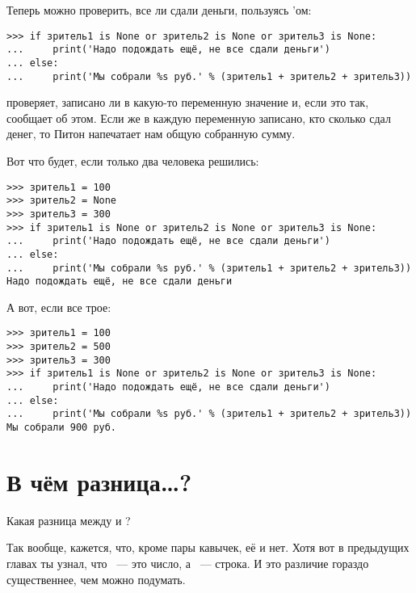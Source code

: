 Теперь можно проверить, все ли сдали деньги, пользуясь 'ом:

\begin{listing}
\begin{verbatim}
>>> if зритель1 is None or зритель2 is None or зритель3 is None:
...     print('Надо подождать ещё, не все сдали деньги')
... else:
...     print('Мы собрали %s руб.' % (зритель1 + зритель2 + зритель3))
\end{verbatim}
\end{listing}

 проверяет, записано ли в какую-то переменную значение  и, если это так, сообщает об этом. Если же в каждую переменную записано, кто сколько сдал денег, то Питон напечатает нам общую собранную сумму.

Вот что будет, если только два человека решились:

\begin{listing}
\begin{verbatim}
>>> зритель1 = 100
>>> зритель2 = None
>>> зритель3 = 300
>>> if зритель1 is None or зритель2 is None or зритель3 is None:
...     print('Надо подождать ещё, не все сдали деньги')
... else:
...     print('Мы собрали %s руб.' % (зритель1 + зритель2 + зритель3))
Надо подождать ещё, не все сдали деньги
\end{verbatim}
\end{listing}

А вот, если все трое:

\begin{listing}
\begin{verbatim}
>>> зритель1 = 100
>>> зритель2 = 500
>>> зритель3 = 300
>>> if зритель1 is None or зритель2 is None or зритель3 is None:
...     print('Надо подождать ещё, не все сдали деньги')
... else:
...     print('Мы собрали %s руб.' % (зритель1 + зритель2 + зритель3))
Мы собрали 900 руб.
\end{verbatim}
\end{listing}

\section{В чём разница…?}\label{whatsthedifference}

Какая разница между  и ?

Так вообще, кажется, что, кроме пары кавычек, её и нет. Хотя вот в предыдущих главах ты узнал, что  — это число, а  — строка. И это различие гораздо существеннее, чем можно подумать.


